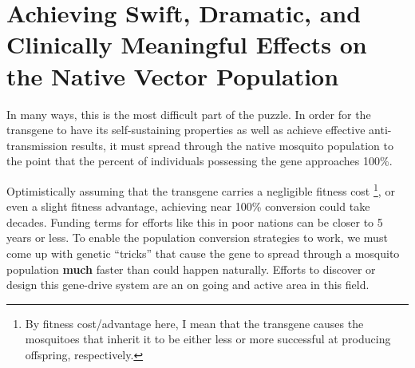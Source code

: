 \section{Achieving Swift, Dramatic, and Clinically Meaningful Effects on the Native Vector Population}

In many ways, this is the most difficult part of the puzzle.
In order for the transgene to have its self-sustaining properties as well as achieve effective anti-transmission results, it must spread through the native mosquito population to the point that the percent of individuals possessing the gene approaches 100\%.

Optimistically assuming that the transgene carries a negligible fitness cost
\footnote{By fitness cost/advantage here, I mean that the transgene
    causes the mosquitoes that inherit it to be either less or more
    successful at producing offspring, respectively.},
or even a slight fitness advantage, achieving near 100\% conversion could take decades.
Funding terms for efforts like this in poor nations can be closer to 5 years or less.
To enable the population conversion strategies to work, we must come up with genetic ``tricks'' that cause the gene to spread through a mosquito population \textbf{much} faster than could happen naturally.
Efforts to discover or design this \gls{gene-drive} system are an on going and active area in this field.